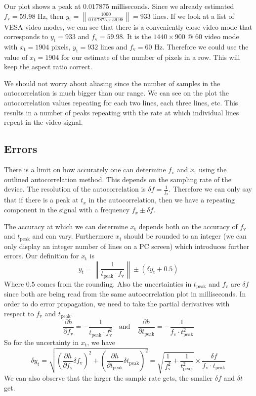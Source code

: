 \documentclass[a4paper,12pt,twoside,openright]{report}
\begin{document}
Our plot shows a peak at $0.017875$ milliseconds. Since we already estimated $f_\text{v} = 59.98$ Hz, then $y_\text{t} = \left\| \frac{1000}{0.017875 \times 59.98} \right\| = 933$ lines. If we look at a list of VESA video modes, we can see that there is a conveniently close video mode that corresponds to $y_\text{t} = 933$ and $f_\text{v} = 59.98$. It is the $1440 \times 900$ @ $60$ video mode with $x_\text{t} = 1904$ pixels, $y_\text{t} = 932$ lines and $f_\text{v}=60$ Hz. Therefore we could use the value of $x_\text{t} = 1904$ for our estimate of the number of pixels in a row. This will keep the aspect ratio correct.

We should not worry about aliasing since the number of samples in the autocorrelation is much bigger than our range. We can see on the plot the autocorrelation values repeating for each two lines, each three lines, etc. This results in a number of peaks repeating with the rate at which individual lines repeat in the video signal.

\subsection{Errors}

There is a limit on how accurately one can determine $f_\text{v}$ and $x_\text{t}$ using the outlined autocorrelation method. This depends on the sampling rate of the device. The resolution of the autocorrelation is $\delta f = \frac{1}{f_\text{s}}$. Therefore we can only say that if there is a peak at $t_{x}$ in the autocorrelation, then we have a repeating component in the signal with a frequency $f_{x} \pm \delta f$.

The accuracy at which we can determine $x_\text{t}$ depends both on the accuracy of $f_\text{v}$ and $t_\text{peak}$ and can vary. Furthermore $x_\text{t}$ should be rounded to an integer (we can only display an integer number of lines on a PC screen) which introduces further errors. Our definition for $x_\text{t}$ is
$$y_\text{t} = \left\| \frac{1}{t_\text{peak} \cdot f_\text{v}} \right\| \pm (\delta y_\text{t} + 0.5)$$
Where $0.5$ comes from the rounding. Also the uncertainties in $t_\text{peak}$ and $f_\text{v}$ are $\delta f$ since both are being read from the same autocorrelation plot in milliseconds. In order to do error propagation, we need to take the partial derivatives with respect to $f_\text{v}$ and $t_\text{peak}$.
$$\frac{\partial h}{\partial f_\text{v}} = - \frac{1}{t_\text{peak} \cdot f_\text{v}^2}
 \,\,\,\,\ \text{and} \,\,\,\,\ \
\frac{\partial h}{\partial t_\text{peak}} = - \frac{1}{f_\text{v} \cdot t_\text{peak}^2}$$
So for the uncertainty in $x_\text{t}$, we have
$$\delta y_\text{t} =
\sqrt{\left( \frac{\partial h}{\partial f_\text{v}} \delta f_\text{v} \right)^2 + \left( \frac{\partial h}{\partial t_\text{peak}} \delta t_\text{peak} \right)^2} = 
\sqrt{\frac{1}{f_\text{v}^2} + \frac{1}{t_\text{peak}^2}} \times \frac{\delta f}{f_\text{v} \cdot t_\text{peak}}$$
We can also observe that the larger the sample rate gets, the smaller $\delta f$ and $\delta t$ get.
\end{document}
